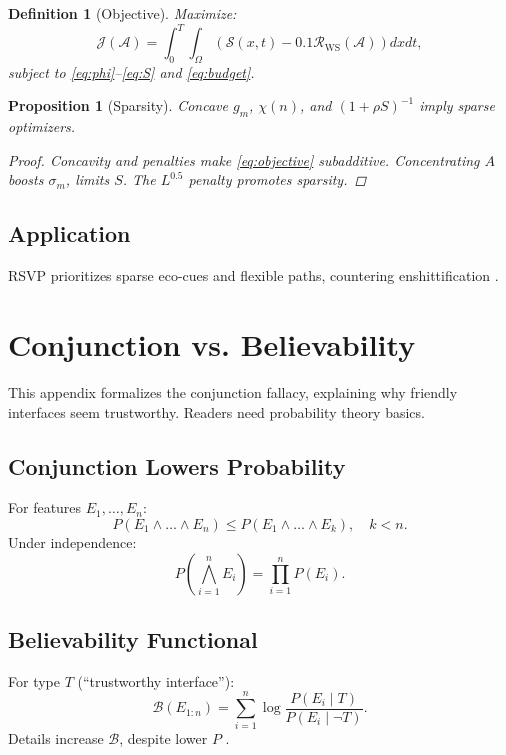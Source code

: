 \documentclass[openany]{book}
\newtheorem{definition}{Definition}[chapter]
\newtheorem{proposition}{Proposition}[chapter]
\newcommand{\Sent}{S} %
\begin{document}
{{{{{{{{{{{{\begin{definition}[Objective]
Maximize:
\begin{equation}
\label{eq:objective}
\mathcal{J}(\mathcal{A}) = \int_{0}^{T} \int_{\Omega} (\mathcal{S}(x,t) - 0.1 \mathcal{R}_{\mathrm{WS}}(\mathcal{A})) dx dt,
\end{equation}
subject to \eqref{eq:phi}--\eqref{eq:S} and \eqref{eq:budget}.
\end{definition}

\begin{proposition}[Sparsity]
Concave \(g_m\), \(\chi(n)\), and \((1 + \rho \Sent)^{-1}\) imply sparse optimizers.
\begin{proof}
Concavity and penalties make \eqref{eq:objective} subadditive. Concentrating \(A\) boosts \(\sigma_{m}\), limits \(\Sent\). The \(L^{0.5}\) penalty promotes sparsity.
\end{proof}
\end{proposition}

\section{Application}
\label{sec:rsvp-application}
RSVP prioritizes sparse eco-cues and flexible paths, countering enshittification \citep{doctorow2022}.

\chapter{Conjunction vs. Believability}
\label{app:conjunction}

This appendix formalizes the conjunction fallacy, explaining why friendly interfaces seem trustworthy. Readers need probability theory basics.

\section{Conjunction Lowers Probability}
\label{sec:conj-prob}
For features \(E_1, \dots, E_n\):
\begin{equation}
\label{eq:conj-prob}
P(E_1 \land \dots \land E_n) \leq P(E_1 \land \dots \land E_k), \quad k < n.
\end{equation}
Under independence:
\begin{equation}
\label{eq:conj-indep}
P(\bigwedge_{i=1}^n E_i) = \prod_{i=1}^n P(E_i).
\end{equation}

\section{Believability Functional}
\label{sec:conj-believability}
For type \(T\) (\textquotedblleft trustworthy interface\textquotedblright):
\begin{equation}
\label{eq:believability-functional}
\mathcal{B}(E_{1:n}) = \sum_{i=1}^n \log \frac{P(E_i \mid T)}{P(E_i \mid \neg T)}.
\end{equation}
Details increase \(\mathcal{B}\), despite lower \(P\) \citep{tversky1983}.

}}}}}}}}}}}}
\end{document}
